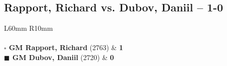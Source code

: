 \documentclass[../main.tex]{subfiles}
\begin{document}
\subsection{Rapport,  Richard vs. Dubov,  Daniil -- 1-0}

\begin{multicols*}{2}

\begin{tabular}{L{60mm} R{10mm}}
\\ 
\\[3mm]
\textbf{$\square$ \hspace{2mm}  GM Rapport,  Richard} (2763)  & \textbf{1}\\ 
\textbf{$\blacksquare$ \hspace{2mm}  GM Dubov,  Daniil} (2720)  & \textbf{0}\\ 
\end{tabular}

\end{multicols*}
\pagebreak
\end{document}
